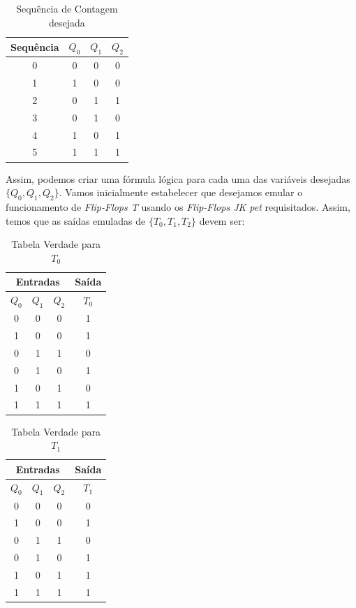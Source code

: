 \documentclass[12pt]{article}
\begin{document}
\begin{table}[H]
    \centering
    \caption{Sequência de Contagem desejada}
    \begin{tabular}{|c||c|c|c|}\hline
      \textbf{Sequência} & \textbf{$Q_{0}$} & \textbf{$Q_{1}$} & \textbf{$Q_{2}$} \\\hline
      0 & 0 & 0 & 0 \\\hline
      1 & 1 & 0 & 0 \\\hline
      2 & 0 & 1 & 1 \\\hline
      3 & 0 & 1 & 0 \\\hline
      4 & 1 & 0 & 1 \\\hline
      5 & 1 & 1 & 1 \\\hline
    \end{tabular}\label{tab:contador_sincrono}
\end{table}

Assim, podemos criar uma fórmula lógica para cada uma das variáveis desejadas
$\{Q_{0}, Q_{1}, Q_{2}\}$. Vamos inicialmente estabelecer que desejamos emular o
funcionamento de \emph{Flip-Flops T} usando os \emph{Flip-Flops JK pet}
requisitados. Assim, temos que as saídas emuladas de $\{T_{0}, T_{1}, T_{2}\}$
devem ser:

\begin{table}[H]
    \centering
    \caption{Tabela Verdade para $T_{0}$}
    \begin{tabular}{|c|c|c||c|}\hline
      \multicolumn{3}{|c||}{Entradas} & \multicolumn{1}{|c|}{Saída} \\\hline
      \textbf{$Q_{0}$} & \textbf{$Q_{1}$} & \textbf{$Q_{2}$} & \textbf{$T_{0}$} \\\hline
      0 & 0 & 0 & 1 \\\hline
      1 & 0 & 0 & 1 \\\hline
      0 & 1 & 1 & 0 \\\hline
      0 & 1 & 0 & 1 \\\hline
      1 & 0 & 1 & 0 \\\hline
      1 & 1 & 1 & 1 \\\hline
    \end{tabular}\label{tab:t0}
\end{table}

\begin{table}[H]
    \centering
    \caption{Tabela Verdade para $T_{1}$}
    \begin{tabular}{|c|c|c||c|}\hline
      \multicolumn{3}{|c||}{Entradas} & \multicolumn{1}{|c|}{Saída} \\\hline
      \textbf{$Q_{0}$} & \textbf{$Q_{1}$} & \textbf{$Q_{2}$} & \textbf{$T_{1}$} \\\hline
      0 & 0 & 0 & 0 \\\hline
      1 & 0 & 0 & 1 \\\hline
      0 & 1 & 1 & 0 \\\hline
      0 & 1 & 0 & 1 \\\hline
      1 & 0 & 1 & 1 \\\hline
      1 & 1 & 1 & 1 \\\hline
    \end{tabular}\label{tab:t1}
\end{table}
\end{document}
